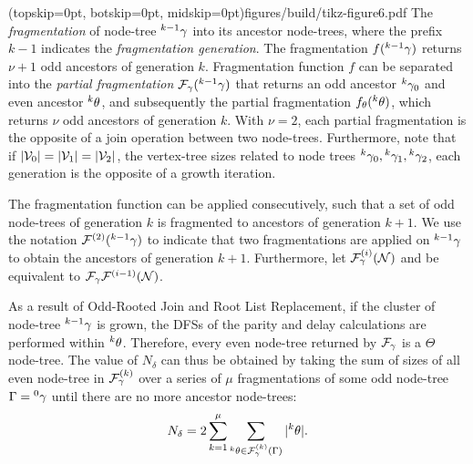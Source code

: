 \Figure[hbt](topskip=0pt, botskip=0pt, midskip=0pt){figures/build/tikz-figure6.pdf}{
  The \emph{fragmentation} of node-tree ${}^{k-1}\gamma$ into its ancestor node-trees, where the prefix $k-1$ indicates the \emph{fragmentation generation}. The fragmentation $f({}^{k-1}\gamma)$ returns $\nu+1$ odd ancestors of generation $k$. Fragmentation function $f$ can be separated into the \emph{partial fragmentation} $\mathcal{F}_\gamma({}^{k-1}\gamma)$ that returns an odd ancestor ${}^{k}\gamma_0$ and even ancestor ${}^{k}\theta$, and subsequently the partial fragmentation $f_\theta({}^{k}\theta)$, which returns $\nu$ odd ancestors of generation $k$. With $\nu=2$, each partial fragmentation is the opposite of a join operation between two node-trees. Furthermore, note that if $\lvert\mathcal{V}_0\rvert = \lvert\mathcal{V}_1\rvert = \lvert\mathcal{V}_2\rvert$, the vertex-tree sizes related to node trees ${}^{k}\gamma_0, {}^{k}\gamma_1, {}^{k}\gamma_2$, each generation is the opposite of a growth iteration. \label{fig6}}


The fragmentation function can be applied consecutively, such that a set of odd node-trees of generation $k$ is fragmented to ancestors of generation $k+1$. We use the notation $\mathcal{F}^{(2)}({}^{k-1}\gamma)$ to indicate that two fragmentations are applied on ${}^{k-1}\gamma$ to obtain the ancestors of generation $k+1$. Furthermore, let $\mathcal{F}_\gamma^{(i)}(\mathcal{N})$ and be equivalent to $\mathcal{F}_\gamma \mathcal{F}^{(i-1)}(\mathcal{N})$. 

As a result of Odd-Rooted Join and Root List Replacement, if the cluster of node-tree ${}^{k-1}\gamma$ is grown, the DFSs of the parity and delay calculations are performed within ${}^{k}\theta$. Therefore, every even node-tree returned by $\mathcal{F}_\gamma$ is a $\Theta$ node-tree. The value of $N_\delta$ can thus be obtained by taking the sum of sizes of all even node-tree in $\mathcal{F}_\gamma^{(k)}$ over a series of $\mu$ fragmentations of some odd node-tree $\Gamma = {}^{0}\gamma$ until there are no more ancestor node-trees:
\begin{equation}\label{eq:npdc}
  N_\delta = 2\sum_{k=1}^\mu{ \sum_{  {}^{k} \theta \in \mathcal{F}_\gamma^{(k)}(\Gamma) }{ \lvert {}^{k} \theta\rvert} }.
\end{equation}

